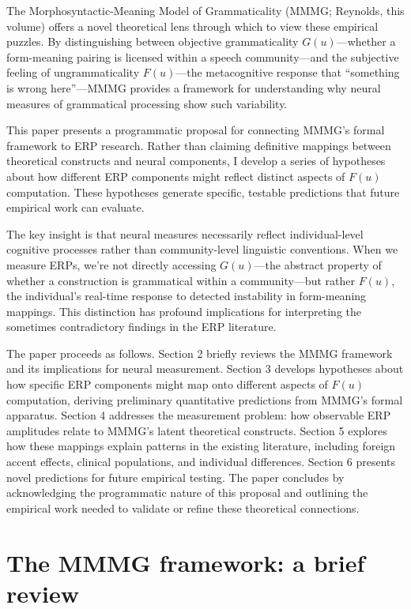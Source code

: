 \documentclass[12pt,letterpaper]{article}
\begin{document}
The Morphosyntactic-Meaning Model of Grammaticality (MMMG; Reynolds, this volume) offers a novel theoretical lens through which to view these empirical puzzles. By distinguishing between objective grammaticality $G(u)$—whether a form-meaning pairing is licensed within a speech community—and the subjective feeling of ungrammaticality $F(u)$—the metacognitive response that \enquote{something is wrong here}—MMMG provides a framework for understanding why neural measures of grammatical processing show such variability.

This paper presents a programmatic proposal for connecting MMMG's formal framework to ERP research. Rather than claiming definitive mappings between theoretical constructs and neural components, I develop a series of hypotheses about how different ERP components might reflect distinct aspects of $F(u)$ computation. These hypotheses generate specific, testable predictions that future empirical work can evaluate. 

The key insight is that neural measures necessarily reflect individual-level cognitive processes rather than community-level linguistic conventions. When we measure ERPs, we're not directly accessing $G(u)$—the abstract property of whether a construction is grammatical within a community—but rather $F(u)$, the individual's real-time response to detected instability in form-meaning mappings. This distinction has profound implications for interpreting the sometimes contradictory findings in the ERP literature.

The paper proceeds as follows. Section 2 briefly reviews the MMMG framework and its implications for neural measurement. Section 3 develops hypotheses about how specific ERP components might map onto different aspects of $F(u)$ computation, deriving preliminary quantitative predictions from MMMG's formal apparatus. Section 4 addresses the measurement problem: how observable ERP amplitudes relate to MMMG's latent theoretical constructs. Section 5 explores how these mappings explain patterns in the existing literature, including foreign accent effects, clinical populations, and individual differences. Section 6 presents novel predictions for future empirical testing. The paper concludes by acknowledging the programmatic nature of this proposal and outlining the empirical work needed to validate or refine these theoretical connections.

\section{The MMMG framework: a brief review}
\end{document}
